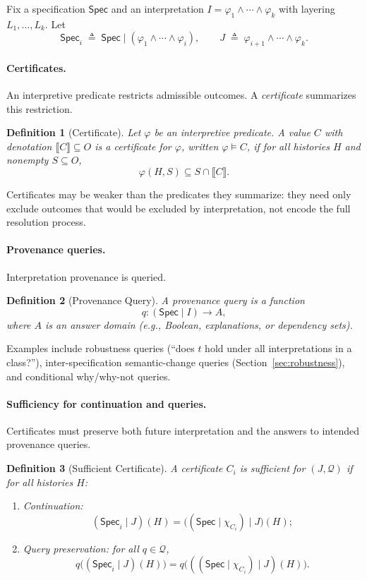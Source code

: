 \documentclass[acmsmall,nonacm]{acmart}
\newtheorem{definition}{Definition}
\theoremstyle{remark}
\numberwithin{definition}{section}
\numberwithin{theorem}{section}
\numberwithin{lemma}{section}
\numberwithin{corollary}{section}
\numberwithin{remark}{section}
\numberwithin{example}{section}
\numberwithin{observation}{section}
\numberwithin{assumption}{section}
\newcommand{\Spec}{\mathsf{Spec}}
\begin{document}
Fix a specification $\Spec$ and an interpretation
$I = \varphi_1 \wedge \cdots \wedge \varphi_k$ with layering
$L_1,\ldots,L_k$.
Let
\[
  \Spec_i \;\triangleq\; \Spec \mid (\varphi_1 \wedge \cdots \wedge \varphi_i),
  \qquad
  J \;\triangleq\; \varphi_{i+1} \wedge \cdots \wedge \varphi_k .
\]

\paragraph{Certificates.}
An interpretive predicate restricts admissible outcomes.
A \emph{certificate} summarizes this restriction.

\begin{definition}[Certificate]
Let $\varphi$ be an interpretive predicate.
A value $C$ with denotation $\llbracket C \rrbracket \subseteq O$ is a
\emph{certificate} for $\varphi$, written $\varphi \models C$, if for all histories
$H$ and nonempty $S \subseteq O$,
\[
  \varphi(H,S) \subseteq S \cap \llbracket C \rrbracket .
\]
\end{definition}

Certificates may be weaker than the predicates they summarize: they need only
exclude outcomes that would be excluded by interpretation, not encode the full
resolution process.

\paragraph{Provenance queries.}
Interpretation provenance is queried.

\begin{definition}[Provenance Query]
A \emph{provenance query} is a function
\[
  q : (\Spec \mid I) \to A ,
\]
where $A$ is an answer domain (e.g., Boolean, explanations, or dependency sets).
\end{definition}

Examples include robustness queries (“does $t$ hold under all interpretations in a
class?”), inter-specification semantic-change queries (Section~\ref{sec:robustness}), and
conditional why/why-not queries.

\paragraph{Sufficiency for continuation and queries.}
Certificates must preserve both future interpretation and the answers to intended
provenance queries.

\begin{definition}[Sufficient Certificate]
A certificate $C_i$ is \emph{sufficient for $(J,\mathcal{Q})$} if for all histories
$H$:
\begin{enumerate}
  \item \emph{Continuation:}
  \[
    (\Spec_i \mid J)(H)
    =
    \bigl((\Spec \mid \chi_{C_i}) \mid J\bigr)(H);
  \]
  \item \emph{Query preservation:} for all $q \in \mathcal{Q}$,
  \[
    q\bigl((\Spec_i \mid J)(H)\bigr)
    =
    q\bigl(((\Spec \mid \chi_{C_i}) \mid J)(H)\bigr).
  \]
\end{enumerate}
\end{definition}
\end{document}
